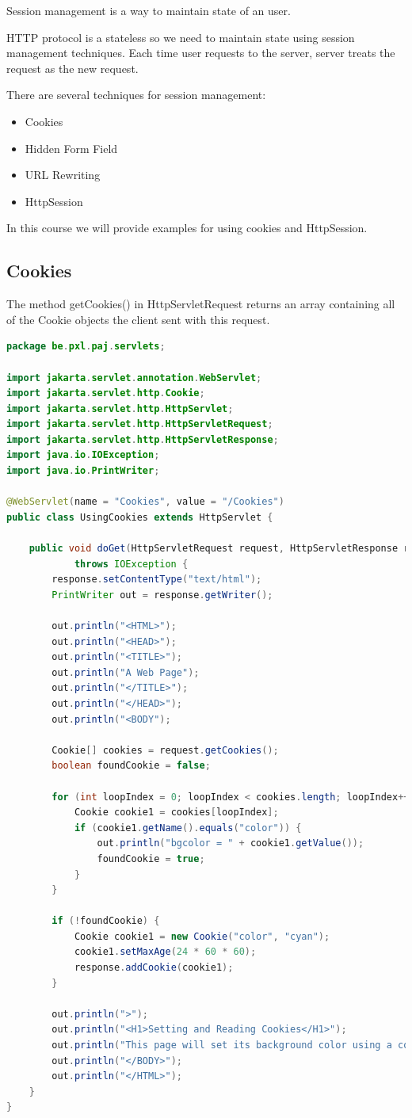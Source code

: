 Session management is a way to maintain state of an user. 

HTTP protocol is a stateless so we need to maintain state using session management techniques. Each time user requests to the server, server treats the request as the new request. 

There are several techniques for session management:

\begin{itemize}
\item Cookies
\item Hidden Form Field
\item URL Rewriting
\item HttpSession
\end{itemize}

In this course we will provide examples for using cookies and HttpSession.

\subsection{Cookies}

The method getCookies() in HttpServletRequest returns an array containing all of the Cookie objects the client sent with this request. 

\begin{lstlisting}[language=java, frame=single]
package be.pxl.paj.servlets;

import jakarta.servlet.annotation.WebServlet;
import jakarta.servlet.http.Cookie;
import jakarta.servlet.http.HttpServlet;
import jakarta.servlet.http.HttpServletRequest;
import jakarta.servlet.http.HttpServletResponse;
import java.io.IOException;
import java.io.PrintWriter;

@WebServlet(name = "Cookies", value = "/Cookies")
public class UsingCookies extends HttpServlet {

	public void doGet(HttpServletRequest request, HttpServletResponse response)
			throws IOException {
		response.setContentType("text/html");
		PrintWriter out = response.getWriter();

		out.println("<HTML>");
		out.println("<HEAD>");
		out.println("<TITLE>");
		out.println("A Web Page");
		out.println("</TITLE>");
		out.println("</HEAD>");
		out.println("<BODY");

		Cookie[] cookies = request.getCookies();
		boolean foundCookie = false;

		for (int loopIndex = 0; loopIndex < cookies.length; loopIndex++) {
			Cookie cookie1 = cookies[loopIndex];
			if (cookie1.getName().equals("color")) {
				out.println("bgcolor = " + cookie1.getValue());
				foundCookie = true;
			}
		}

		if (!foundCookie) {
			Cookie cookie1 = new Cookie("color", "cyan");
			cookie1.setMaxAge(24 * 60 * 60);
			response.addCookie(cookie1);
		}

		out.println(">");
		out.println("<H1>Setting and Reading Cookies</H1>");
		out.println("This page will set its background color using a cookie when reloaded.");
		out.println("</BODY>");
		out.println("</HTML>");
	}
}
\end{lstlisting}

